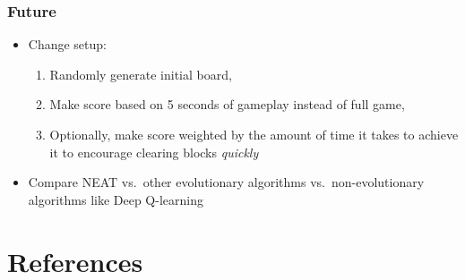 \documentclass[t,pdflatex]{beamer}
\begin{document}
        \begin{frame}

        \frametitle{Future}
        \begin{itemize}
            \item Change setup:
                \begin{enumerate}
                    \item Randomly generate initial board,
                    \item Make score based on 5 seconds of gameplay instead of full game,
                    \item Optionally, make score weighted by the amount of time it takes to achieve it to encourage clearing blocks \emph{quickly}
                \end{enumerate}
            \item Compare NEAT vs.\ other evolutionary algorithms vs.\ non-evolutionary algorithms like Deep Q-learning
        \end{itemize}


    \end{frame}

    \section{References}
\end{document}
